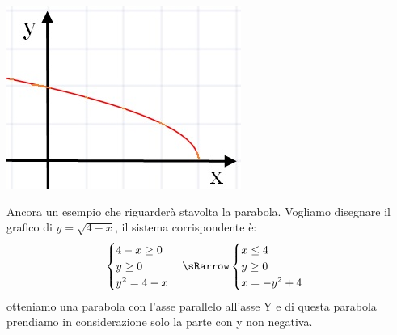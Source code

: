 \noindent 
\begin{minipage}{.2\textwidth}
  \includegraphics[width=\textwidth]{img/curva3.jpg}
\end{minipage}
  \hfill
\begin{minipage}{.75\textwidth}
Ancora un esempio che riguarderà stavolta la parabola. 
Vogliamo disegnare il grafico di $ y=\sqrt{4-x} $, il sistema 
corrispondente è:
\[\begin{cases}  4-x\geq0   \\ y\geq0  \\y^{2}=4-x 
\end{cases} \sRarrow
\begin{cases}   x\leq4   \\ y\geq0  \\ x=-y^{2}+4 
\end{cases}\]
otteniamo una parabola con l'asse parallelo all'asse Y e di questa parabola 
prendiamo in considerazione solo la parte con y non negativa.
  \end{minipage}


